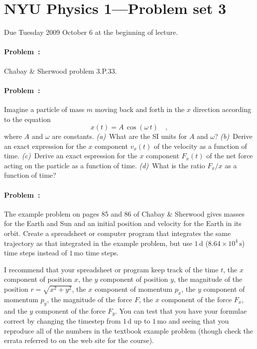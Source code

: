 \documentclass[12pt]{article}
\newcommand{\s}{\mathrm{s}}
\renewcommand{\d}{\mathrm{d}}
\newcommand{\mo}{\mathrm{mo}}
\newcounter{problem}
\begin{document}
\thispagestyle{empty}

\section*{NYU Physics 1---Problem set 3}

Due Tuesday 2009 October 6 at the beginning of lecture.

\paragraph{Problem~\theproblem:}%
Chabay \& Sherwood problem 3.P.33.

\paragraph{Problem~\theproblem:}%
Imagine a particle of mass $m$ moving back and forth in the $x$
direction according to the equation
\begin{equation}
x(t)= A\,\cos\left(\omega\,t\right) \quad ,
\end{equation}
where $A$ and $\omega$ are constants.  \textsl{(a)}~What are the SI
units for $A$ and $\omega$?  \textsl{(b)}~Derive an exact expression
for the $x$ component $v_x(t)$ of the velocity as a function of time.
\textsl{(c)}~Derive an exact espression for the $x$ component $F_x(t)$
of the net force acting on the particle as a function of time.
\textsl{(d)}~What is the ratio $F_x/x$ as a function of time?

\paragraph{Problem~\theproblem:}%
The example problem on pages 85 and 86 of Chabay \& Sherwood gives
masses for the Earth and Sun and an initial position and velocity for
the Earth in its orbit.  Create a spreadsheet or computer program that
integrates the same trajectory as that integrated in the example
problem, but use $1\,\d$ ($8.64\times 10^4\,\s$) time steps instead of
$1\,\mo$ time steps.

I recommend that your spreadsheet or program keep track of the time
$t$, the $x$ component of position $x$, the $y$ component of position
$y$, the magnitude of the position $r=\sqrt{x^2+y^2}$, the $x$
component of momentum $p_x$, the $y$ component of momentum $p_y$, the
magnitude of the force $F$, the $x$ component of the force $F_x$, and
the $y$ component of the force $F_y$.  You can test that you have your
formulae correct by changing the timestep from $1\,\d$ up to $1\,\mo$
and seeing that you reproduce all of the numbers in the textbook
example problem (though check the errata referred to on the web site
for the course).
\end{document}
